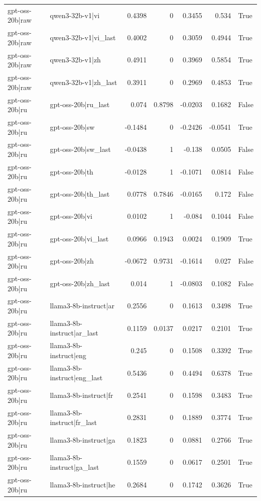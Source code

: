 \begin{table}
\begin{tabular}{l l r r r r l}
gpt-oss-20b|raw & qwen3-32b-v1|vi & 0.4398 & 0 & 0.3455 & 0.534 & True \\
gpt-oss-20b|raw & qwen3-32b-v1|vi_last & 0.4002 & 0 & 0.3059 & 0.4944 & True \\
gpt-oss-20b|raw & qwen3-32b-v1|zh & 0.4911 & 0 & 0.3969 & 0.5854 & True \\
gpt-oss-20b|raw & qwen3-32b-v1|zh_last & 0.3911 & 0 & 0.2969 & 0.4853 & True \\
gpt-oss-20b|ru & gpt-oss-20b|ru_last & 0.074 & 0.8798 & -0.0203 & 0.1682 & False \\
gpt-oss-20b|ru & gpt-oss-20b|sw & -0.1484 & 0 & -0.2426 & -0.0541 & True \\
gpt-oss-20b|ru & gpt-oss-20b|sw_last & -0.0438 & 1 & -0.138 & 0.0505 & False \\
gpt-oss-20b|ru & gpt-oss-20b|th & -0.0128 & 1 & -0.1071 & 0.0814 & False \\
gpt-oss-20b|ru & gpt-oss-20b|th_last & 0.0778 & 0.7846 & -0.0165 & 0.172 & False \\
gpt-oss-20b|ru & gpt-oss-20b|vi & 0.0102 & 1 & -0.084 & 0.1044 & False \\
gpt-oss-20b|ru & gpt-oss-20b|vi_last & 0.0966 & 0.1943 & 0.0024 & 0.1909 & True \\
gpt-oss-20b|ru & gpt-oss-20b|zh & -0.0672 & 0.9731 & -0.1614 & 0.027 & False \\
gpt-oss-20b|ru & gpt-oss-20b|zh_last & 0.014 & 1 & -0.0803 & 0.1082 & False \\
gpt-oss-20b|ru & llama3-8b-instruct|ar & 0.2556 & 0 & 0.1613 & 0.3498 & True \\
gpt-oss-20b|ru & llama3-8b-instruct|ar_last & 0.1159 & 0.0137 & 0.0217 & 0.2101 & True \\
gpt-oss-20b|ru & llama3-8b-instruct|eng & 0.245 & 0 & 0.1508 & 0.3392 & True \\
gpt-oss-20b|ru & llama3-8b-instruct|eng_last & 0.5436 & 0 & 0.4494 & 0.6378 & True \\
gpt-oss-20b|ru & llama3-8b-instruct|fr & 0.2541 & 0 & 0.1598 & 0.3483 & True \\
gpt-oss-20b|ru & llama3-8b-instruct|fr_last & 0.2831 & 0 & 0.1889 & 0.3774 & True \\
gpt-oss-20b|ru & llama3-8b-instruct|ga & 0.1823 & 0 & 0.0881 & 0.2766 & True \\
gpt-oss-20b|ru & llama3-8b-instruct|ga_last & 0.1559 & 0 & 0.0617 & 0.2501 & True \\
gpt-oss-20b|ru & llama3-8b-instruct|he & 0.2684 & 0 & 0.1742 & 0.3626 & True \\

\end{tabular}
\end{table}

